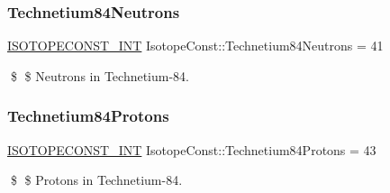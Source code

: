 \subsubsection{\texorpdfstring{Technetium84\+Neutrons}{Technetium84Neutrons}}
{\footnotesize\ttfamily \mbox{\hyperlink{group___isotope_const-_macros_ga5f18360b3e99483a35c32d789e62621c}{I\+S\+O\+T\+O\+P\+E\+C\+O\+N\+S\+T\+\_\+\+I\+NT}} Isotope\+Const\+::\+Technetium84\+Neutrons = 41}

\$ \$ Neutrons in Technetium-\/84. \mbox{\label{group___isotope_const-_technetium-_tc84_gafceef1a6c0174cc4e761d431b0141936}} 
\subsubsection{\texorpdfstring{Technetium84\+Protons}{Technetium84Protons}}
{\footnotesize\ttfamily \mbox{\hyperlink{group___isotope_const-_macros_ga5f18360b3e99483a35c32d789e62621c}{I\+S\+O\+T\+O\+P\+E\+C\+O\+N\+S\+T\+\_\+\+I\+NT}} Isotope\+Const\+::\+Technetium84\+Protons = 43}

\$ \$ Protons in Technetium-\/84. 